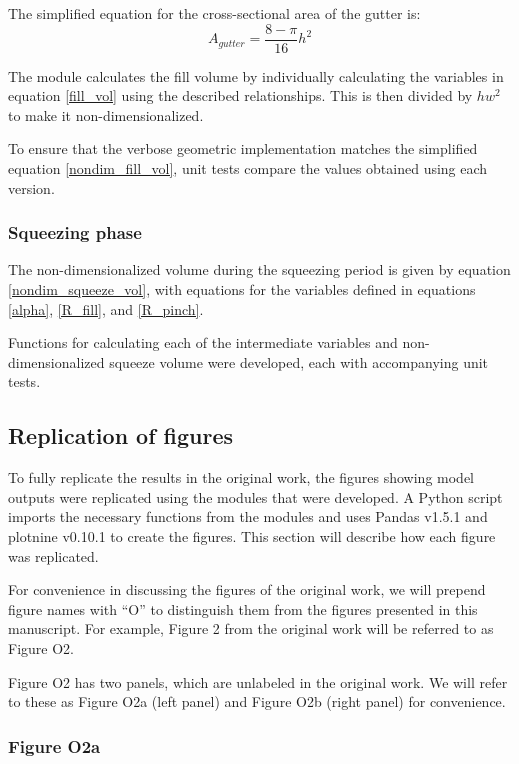 \noindent The simplified equation for the cross-sectional area of the gutter is:
$$A_{gutter} = \frac{8-\pi}{16}h^2$$

\noindent The module calculates the fill volume by individually calculating the variables in equation
\eqref{fill_vol} using the described relationships.
This is then divided by $hw^2$ to make it non-dimensionalized.

To ensure that the verbose geometric implementation matches the simplified equation \eqref{nondim_fill_vol}, 
unit tests compare the values obtained using each version.

\subsubsection{Squeezing phase}
The non-dimensionalized volume during the squeezing period is given by equation \eqref{nondim_squeeze_vol}, with
equations for the variables defined in equations \eqref{alpha}, \eqref{R_fill}, and \eqref{R_pinch}.

Functions for calculating each of the intermediate variables and non-dimensionalized squeeze volume
were developed, each with accompanying unit tests.

\subsection{Replication of figures}

To fully replicate the results in the original work, the figures showing model outputs were
replicated using the modules that were developed. A Python script imports the necessary
functions from the modules and uses Pandas\supercite{team_pandas_2020} v1.5.1
and plotnine\supercite{kibirige_plotnine_2022} v0.10.1 to create the figures.
This section will describe how each figure was replicated.

For convenience in discussing the figures of the original work, we will prepend figure names
with “O” to distinguish them from the figures presented in this manuscript. For example, Figure 2 from
the original work will be referred to as Figure O2.

Figure O2 has two panels, which are unlabeled in the original work. We will refer to these as Figure O2a
(left panel) and Figure O2b (right panel) for convenience.

\subsubsection{Figure O2a}

